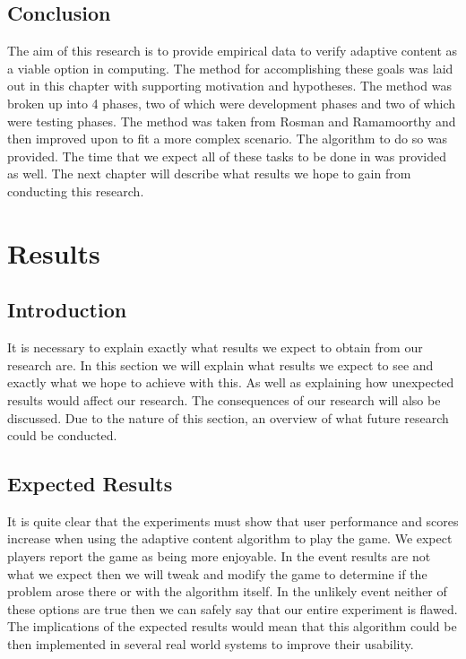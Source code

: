 \documentclass[11pt]{article}
\begin{document}
\subsection{Conclusion}
The aim of this research is to provide empirical data to verify adaptive content as a viable option in computing. The method for accomplishing these goals was laid out in this chapter with supporting motivation and hypotheses. The method was broken up into 4 phases, two of which were development phases and two of which were testing phases. The method was taken from Rosman and Ramamoorthy \citep{ramamoorthy2013latent} and then improved upon to fit a more complex scenario. The algorithm to do so was provided. The time that we expect all of these tasks to be done in was provided as well. The next chapter will describe what results we hope to gain from conducting this research.


\vspace{6.0 mm}
\clearpage
\section{Results}
\subsection{Introduction}

It is necessary to explain exactly what results we expect to obtain from our research are. In this section we will explain what results we expect to see and exactly what we hope to achieve with this. As well as explaining how unexpected results would affect our research. The consequences of our research will also be discussed. Due to the nature of this section, an overview of what future research could be conducted.

\vspace{6.0 mm}
\subsection{Expected Results}

It is quite clear that the experiments must show that user performance and scores increase when using the adaptive content algorithm to play the game. We expect players report the game as being more enjoyable. In the event results are not what we expect then we will tweak and modify the game to determine if the problem arose there or with the algorithm itself. In the unlikely event neither of these options are true then we can safely say that our entire experiment is flawed. The implications of the expected results would mean that this algorithm could be then implemented in several real world systems to improve their usability.
\vspace{6.0 mm}
\end{document}
